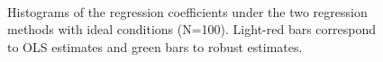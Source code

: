 \documentclass[a4paper]{article}
\begin{document}
\begin{figure}[h]
\begin{center}
{{			}
		}\\ 	%
	\end{center}
	\caption{Histograms of the regression coefficients under the two regression methods with ideal conditions (N=100). Light-red bars correspond to OLS estimates and green bars to robust estimates.}
	\label{Figure1}
\end{figure}
\end{document}
